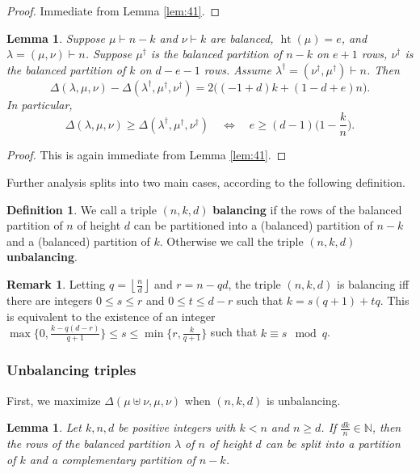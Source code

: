\documentclass[12pt,dvipsnames,accepted=2016-08-18,a4paper,onecolumn]{quantumarticle}
\def\la{\lambda}
\DeclareMathOperator{\het}{ht}
\newcommand{\floor}[1]{\left\lfloor #1 \right\rfloor}
\def\la{\lambda}
\numberwithin{equation}{section}
\newtheorem{lemma}[theorem]{Lemma}
\theoremstyle{definition}
\newtheorem{definition}[theorem]{Definition}
\newtheorem{remark}[theorem]{Remark}
\begin{document}
\begin{proof}
Immediate from Lemma \ref{lem:41}.
\end{proof}

\def\dag{\dagger}
\begin{lemma}\label{lem:43}
Suppose $\mu\vdash n-k$ and $\nu\vdash k$ are balanced, 
$\het(\mu)=e$, 
and $\lambda=(\mu,\nu)\vdash n$.
Suppose $\mu^\dagger$ is the balanced partition of $n-k$ on $e+1$ rows, $\nu^\dagger$ is the balanced partition of $k$ on $d-e-1$ rows. Assume $\la^\dag=(\nu^\dag,\mu^\dag)\vdash n$.
Then
\[
    \Delta(\la,\mu,\nu)-\Delta(\la^\dag,\mu^\dag,\nu^\dag) =
    2 \big((-1 + d) k + (1 - d + e) n\big).
\]
In particular, 
\[\Delta(\la,\mu,\nu)\geq \Delta(\la^\dag,\mu^\dag,\nu^\dag) 
\quad\iff\quad
e\geq(d-1) \Big(1-\frac{k}{n}\Big).
\]
\end{lemma}


\begin{proof}
This is again immediate from Lemma \ref{lem:41}.
\end{proof}

Further analysis splits into two main cases, according to the following definition.

\begin{definition}\label{def:unbalancing}
We call a triple $(n,k,d)$ \textbf{balancing} if the
rows of the balanced partition of $n$ of height $d$ 
can be partitioned into a (balanced) partition of $n-k$
and a (balanced) partition of $k$. Otherwise we call the triple
$(n,k,d)$ \textbf{unbalancing}.
\end{definition}

\begin{remark}\label{rem:bal}
Letting $q=\floor{\frac nd}$ and $r=n-qd$, the triple
$(n,k,d)$ is balancing iff there are integers $0\le s\le r$ and $0\le t\le d-r$ such that $k=s(q+1)+tq$. This is equivalent to the existence of an integer $\max\{0,\frac{k-q(d-r)}{q+1}\}\le s\le \min\{r,\frac{k}{q+1}\}$ such that $k\equiv s\mod q$.
\end{remark}

\subsubsection{Unbalancing triples}

First, we maximize $\Delta(\mu\uplus\nu,\mu,\nu)$ when $(n,k,d)$ is unbalancing.

\begin{lemma}\label{lem:balancing}
Let $k,n,d$ be positive integers with $k< n$ and $n\ge d$.  If $\frac{dk}{n}\in\mathbb{N}$, then the rows of the balanced partition $\la$ of $n$ of height $d$ can be split into a partition of $k$ and a complementary partition of $n-k$.
\end{lemma}
\end{document}
